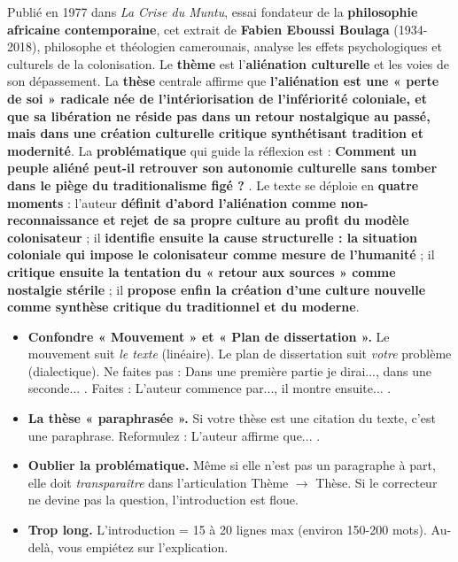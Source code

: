 \documentclass[11pt]{article}
\begin{document}
\begin{corrige}
\guillemotleft Publié en 1977 dans \emph{La Crise du Muntu}, essai fondateur de la \textbf{philosophie africaine contemporaine}, cet extrait de \textbf{Fabien Eboussi Boulaga} (1934-2018), philosophe et théologien camerounais, analyse les effets psychologiques et culturels de la colonisation. Le \textbf{thème} est l'\textbf{aliénation culturelle} et les voies de son dépassement. La \textbf{thèse} centrale affirme que \textbf{l'aliénation est une « perte de soi » radicale née de l'intériorisation de l'infériorité coloniale, et que sa libération ne réside pas dans un retour nostalgique au passé, mais dans une création culturelle critique synthétisant tradition et modernité}. La \textbf{problématique} qui guide la réflexion est : \guillemotleft \textbf{Comment un peuple aliéné peut-il retrouver son autonomie culturelle sans tomber dans le piège du traditionalisme figé ?} \guillemotright. Le texte se déploie en \textbf{quatre moments} : l'auteur \textbf{définit d'abord l'aliénation comme non-reconnaissance et rejet de sa propre culture au profit du modèle colonisateur} ; il \textbf{identifie ensuite la cause structurelle : la situation coloniale qui impose le colonisateur comme mesure de l'humanité} ; il \textbf{critique ensuite la tentation du « retour aux sources » comme nostalgie stérile} ; il \textbf{propose enfin la création d'une culture nouvelle comme synthèse critique du traditionnel et du moderne}. \guillemotright
\end{corrige}

\begin{attention}
\begin{itemize}
    \item \textbf{Confondre « Mouvement » et « Plan de dissertation ».} Le mouvement suit \emph{le texte} (linéaire). Le plan de dissertation suit \emph{votre} problème (dialectique). Ne faites pas : \guillemotleft Dans une première partie je dirai..., dans une seconde... \guillemotright. Faites : \guillemotleft L'auteur commence par..., il montre ensuite... \guillemotright.
    \item \textbf{La thèse « paraphrasée ».} Si votre thèse est une citation du texte, c'est une paraphrase. Reformulez : \guillemotleft L'auteur affirme que... \guillemotright.
    \item \textbf{Oublier la problématique.} Même si elle n'est pas un paragraphe à part, elle doit \emph{transparaître} dans l'articulation Thème $\rightarrow$ Thèse. Si le correcteur ne devine pas la question, l'introduction est floue.
    \item \textbf{Trop long.} L'introduction = 15 à 20 lignes max (environ 150-200 mots). Au-delà, vous empiétez sur l'explication.
\end{itemize}
\end{attention}
\end{document}

